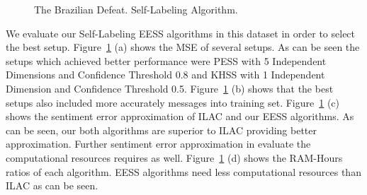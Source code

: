 \begin{figure}[htb]
\centering
{}
\caption{The Brazilian Defeat. Self-Labeling Algorithm.}
\label{fig:por-sl}
\end{figure}

We evaluate our Self-Labeling EESS algorithms in this dataset in order to select the best setup. Figure~\ref{fig:por-sl} (a) shows the MSE of several setups. As can be seen the setups which achieved better performance were PESS with 5 Independent Dimensions and Confidence Threshold 0.8 and KHSS with 1 Independent Dimension and Confidence Threshold 0.5. Figure~\ref{fig:por-sl} (b) shows that the best setups also included more accurately messages into training set. Figure~\ref{fig:por-sl} (c) shows the sentiment error approximation of ILAC and our EESS algorithms. As can be seen, our both algorithms are superior to ILAC providing better approximation. Further sentiment error approximation in evaluate the computational resources requires as well. Figure~\ref{fig:por-sl} (d) shows the RAM-Hours ratios of each algorithm. EESS algorithms need less computational resources than ILAC as can be seen.

